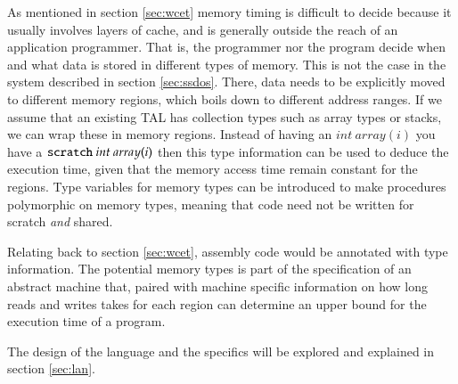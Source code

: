 As mentioned in section \ref{sec:wcet} memory timing is difficult to decide
because it usually involves layers of cache, and is generally outside the reach
of an application programmer. That is, the programmer nor the program decide
when and what data is stored in different types of memory.
This is not the case in the system described in section \ref{sec:ssdos}. There,
data needs to be explicitly moved to different memory regions, which boils down
to different address ranges.
If we assume that an existing TAL has collection types such as array
types\cite{xi-dtal} or stacks\cite{stal}, we can wrap these in memory regions.
Instead of having an $int\ array(i)$ you have a $\texttt{scratch}\ int\ array(i)$ then
this type information can be used to deduce the execution time, given that the
memory access time remain constant for the regions.
Type variables for memory types can be introduced to make procedures
polymorphic on memory types, meaning that code need not be written for scratch
\emph{and} shared.

Relating back to section \ref{sec:wcet}, assembly code would be annotated with
type information. The potential memory types is part of the specification of an
abstract machine that, paired with machine specific information on how long
reads and writes takes for each region can determine an upper bound for the
execution time of a program.

The design of the language and the specifics will be explored and explained in
section \ref{sec:lan}.
